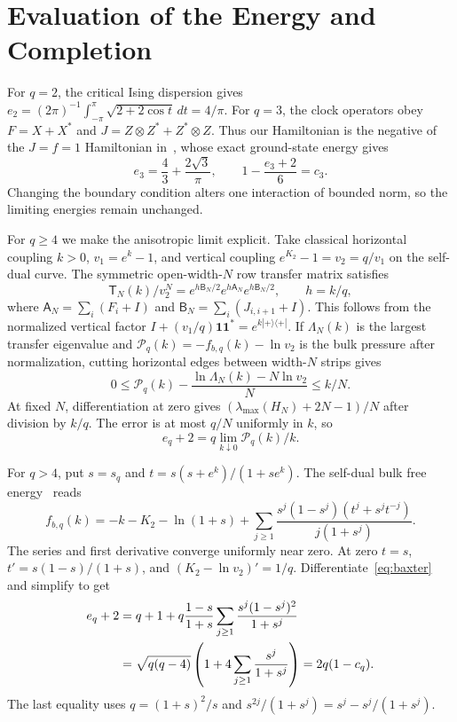\documentclass[12pt,letterpaper,onecolumn]{article}
\newcommand{\one}{\mathbf 1}
\begin{document}
\section{Evaluation of the Energy and Completion}
For $q=2$, the critical Ising dispersion gives
$e_2=(2\pi)^{-1}\int_{-\pi}^\pi\sqrt{2+2\cos t}\,dt=4/\pi$.
For $q=3$, the clock operators obey $F=X+X^*$ and $J=Z\otimes Z^*+Z^*\otimes Z$. Thus our Hamiltonian is the negative of the $J=f=1$ Hamiltonian in~\cite[Sec.~2.1 and text after Eq.~(32)]{mong2014}, whose exact ground-state energy gives
\begin{equation}\label{eq:smallenergy}
e_3=\frac43+\frac{2\sqrt3}\pi,\qquad
1-\frac{e_3+2}{6}=c_3.
\end{equation}
Changing the boundary condition alters one interaction of bounded norm, so the limiting energies remain unchanged.

For $q\ge4$ we make the anisotropic limit explicit. Take classical horizontal coupling $k>0$, $v_1=e^k-1$, and vertical coupling $e^{K_2}-1=v_2=q/v_1$ on the self-dual curve. The symmetric open-width-$N$ row transfer matrix satisfies
\[
\mathsf T_N(k)/v_2^N
=e^{h\mathsf B_N/2}e^{h\mathsf A_N}e^{h\mathsf B_N/2},\qquad h=k/q,
\]
where $\mathsf A_N=\sum_i(F_i+I)$ and $\mathsf B_N=\sum_i(J_{i,i+1}+I)$. This follows from the normalized vertical factor
$I+(v_1/q)\one\one^*=e^{k|+\rangle\langle+|}$.
If $\Lambda_N(k)$ is the largest transfer eigenvalue and
$\mathcal P_q(k)=-f_{b,q}(k)-\ln v_2$ is the bulk pressure after normalization, cutting horizontal edges between width-$N$ strips gives
\[
0\le\mathcal P_q(k)-\frac{\ln\Lambda_N(k)-N\ln v_2}{N}\le k/N.
\]
At fixed $N$, differentiation at zero gives
$(\lambda_{\max}(H_N)+2N-1)/N$ after division by $k/q$. The error is at most $q/N$ uniformly in $k$, so
\begin{equation}\label{eq:slope}
e_q+2=q\lim_{k\downarrow0}\mathcal P_q(k)/k.
\end{equation}

For $q>4$, put $s=s_q$ and $t=s(s+e^k)/(1+se^k)$. The self-dual bulk free energy~\cite[Eq.~(3.29)]{baxter} reads
\begin{equation}\label{eq:baxter}
f_{b,q}(k)=-k-K_2-\ln(1+s)
+\sum_{j\ge1}\frac{s^j(1-s^j)(t^j+s^jt^{-j})}{j(1+s^j)}.
\end{equation}
The series and first derivative converge uniformly near zero. At zero $t=s$, $t'=s(1-s)/(1+s)$, and $(K_2-\ln v_2)'=1/q$. Differentiate~\eqref{eq:baxter} and simplify to get
\begin{align}
e_q+2
&=q+1+q\frac{1-s}{1+s}\sum_{j\ge1}\frac{s^j(1-s^j)^2}{1+s^j}\notag\\
&=\sqrt{q(q-4)}\left(1+4\sum_{j\ge1}\frac{s^j}{1+s^j}\right)
=2q(1-c_q).\label{eq:largeenergy}
\end{align}
The last equality uses $q=(1+s)^2/s$ and
$s^{2j}/(1+s^j)=s^j-s^j/(1+s^j)$.
\end{document}
